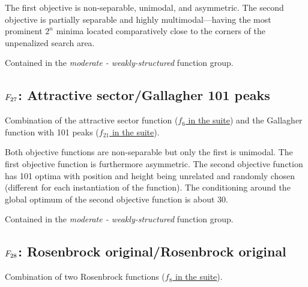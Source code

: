 The first objective is non-separable, unimodal, and asymmetric.
The second objective is partially separable and highly multimodal---having
the most prominent \(2^n\) minima located comparatively close to the
corners of the unpenalized search area.

Contained in the \emph{moderate - weakly-structured} function group.



\subsection[\texorpdfstring{\protect\(F_{27}\protect\): Attractive sector/Gallagher 101 peaks}{F27: Attractive sector/Gallagher 101 peaks}]{\texorpdfstring{\protect\(F_{27}\protect\): Attractive sector/Gallagher 101 peaks}{}}
\label{index:f27}\label{index:attractive-sector-gallagher-101-peaks}
Combination of the attractive sector function (\href{https://coco.gforge.inria.fr/downloads/download16.00/bbobdocfunctions.pdf\#page=30}{\(f_6\) in the \bbob suite}) and the Gallagher function with 101 peaks (\href{https://coco.gforge.inria.fr/downloads/download16.00/bbobdocfunctions.pdf\#page=105}{\(f_{21}\) in the \bbob suite}).

Both objective functions are non-separable but only the first
is unimodal. The first objective function is furthermore asymmetric.
The second objective function has 101 optima with position and height
being unrelated and randomly chosen (different for each instantiation
of the function). The conditioning around the global optimum of the second
objective function is about 30.

Contained in the \emph{moderate - weakly-structured} function group.



\subsection[\texorpdfstring{\protect\(F_{28}\protect\): Rosenbrock original/Rosenbrock original}{F28: Rosenbrock original/Rosenbrock original}]{\texorpdfstring{\protect\(F_{28}\protect\): Rosenbrock original/Rosenbrock original}{}}
\label{index:rosenbrock-original-rosenbrock-original}\label{index:f28}
Combination of two Rosenbrock functions (\href{https://coco.gforge.inria.fr/downloads/download16.00/bbobdocfunctions.pdf\#page=40}{\(f_8\) in the \bbob suite}).

